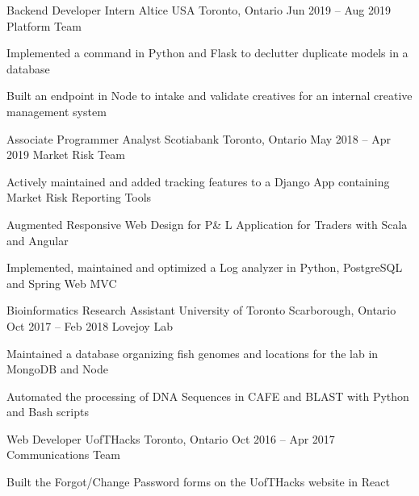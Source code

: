 \begin{cventries}
  \cventry
    {Backend Developer Intern}
    {Altice USA}
    {Toronto, Ontario}
    {Jun 2019 -- Aug 2019}
    {Platform Team}
    {
    \begin{cvitems}
      \item {Implemented a command in Python and Flask to declutter duplicate models in a database}
      \item {Built an endpoint in Node to intake and validate creatives for an internal creative management system}
    \end{cvitems}
    }
  \cventry
    {Associate Programmer Analyst}
    {Scotiabank}
    {Toronto, Ontario}
    {May 2018 -- Apr 2019}
    {Market Risk Team}
    {
      \begin{cvitems}
        \item {Actively maintained and added tracking features to a Django App containing Market Risk Reporting Tools}
        \item {Augmented Responsive Web Design for P\& L Application for Traders with Scala and Angular}
        \item {Implemented, maintained and optimized a Log analyzer in Python, PostgreSQL and Spring Web MVC}
      \end{cvitems}
    }

  \cventry
    {Bioinformatics Research Assistant}
    {University of Toronto}
    {Scarborough, Ontario}
    {Oct 2017 -- Feb 2018}
    {Lovejoy Lab}
    {
      \begin{cvitems}
        \item {Maintained a database organizing fish genomes and locations for the lab in MongoDB and Node}
        \item {Automated the processing of DNA Sequences in CAFE and BLAST with Python and Bash scripts}
      \end{cvitems}
    }
    \cventry
    {Web Developer}
    {UofTHacks}
    {Toronto, Ontario}
    {Oct 2016 -- Apr 2017}
    {Communications Team}
    {
      \begin{cvitems}
        \item {Built the Forgot/Change Password forms on the UofTHacks website in React}
      \end{cvitems}
    }
\end{cventries}
